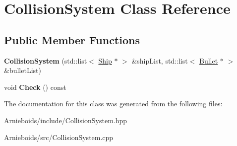 \hypertarget{class_collision_system}{}\section{Collision\+System Class Reference}
\label{class_collision_system}
\subsection*{Public Member Functions}
\begin{DoxyCompactItemize}
\item 
\hypertarget{class_collision_system_ae4462bc260f16652e5af659164109736}{}{\bfseries Collision\+System} (std\+::list$<$ \hyperlink{class_ship}{Ship} $\ast$ $>$ \&ship\+List, std\+::list$<$ \hyperlink{class_bullet}{Bullet} $\ast$ $>$ \&bullet\+List)\label{class_collision_system_ae4462bc260f16652e5af659164109736}

\item 
\hypertarget{class_collision_system_a0ea99c0b3b16a7df82aad2cb43ecd422}{}void {\bfseries Check} () const \label{class_collision_system_a0ea99c0b3b16a7df82aad2cb43ecd422}

\end{DoxyCompactItemize}


The documentation for this class was generated from the following files\+:\begin{DoxyCompactItemize}
\item 
Arnieboids/include/Collision\+System.\+hpp\item 
Arnieboids/src/Collision\+System.\+cpp\end{DoxyCompactItemize}
